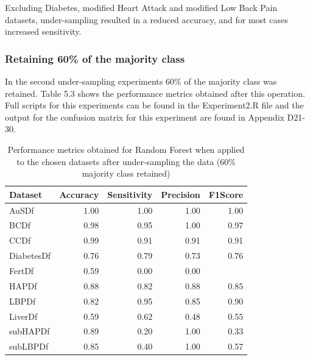 Excluding Diabetes, modified Heart Attack and modified Low Back Pain datasets, under-sampling resulted in a reduced accuracy, and for most cases increased sensitivity. 


\subsubsection{Retaining 60\% of the majority class}
In the second under-sampling experiments 60\% of the majority class was retained. Table 5.3 shows the performance metrics obtained after this operation. Full scripts for this experiments can be found in the Experiment2.R file and the output for the confusion matrix for this experiment are found in Appendix D21-30.

\begin{table}[ht]
\centering
\begin{tabular}{lrrrr}
  \hline
  \rowcolor{LightCyan}
Dataset & Accuracy & Sensitivity & Precision & F1Score \\ 
  \hline
AuSDf & 1.00 & 1.00 & 1.00 & 1.00 \\ 
  BCDf & 0.98 & 0.95 & 1.00 & 0.97 \\ 
  CCDf & 0.99 & 0.91 & 0.91 & 0.91 \\ 
  DiabetesDf & 0.76 & 0.79 & 0.73 & 0.76 \\ 
  FertDf & 0.59 & 0.00 & 0.00 &  \\ 
  HAPDf & 0.88 & 0.82 & 0.88 & 0.85 \\ 
  LBPDf & 0.82 & 0.95 & 0.85 & 0.90 \\ 
  LiverDf & 0.59 & 0.62 & 0.48 & 0.55 \\ 
  subHAPDf & 0.89 & 0.20 & 1.00 & 0.33 \\ 
  subLBPDf & 0.85 & 0.40 & 1.00 & 0.57 \\ 
   \hline
\end{tabular}
\caption{Performance metrics obtained for Random Forest when applied to the chosen datasets after under-sampling the data (60\% majority class retained)}
\label{tab:RfMetrics60}
\end{table}

